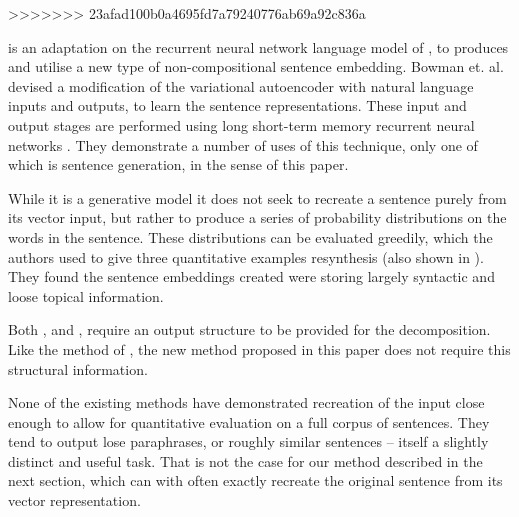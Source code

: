 \documentclass[11pt]{article}
\theoremstyle{plain}
\theoremstyle{definition}
\begin{document}
>>>>>>> 23afad100b0a4695fd7a79240776ab69a92c836a




\textcite{Bowman2015SmoothGeneration} is an adaptation on the recurrent neural network language model of \textcite{mikolov2011RnnLM}, to produces and utilise a new type of non-compositional sentence embedding. Bowman et. al. devised a modification of the variational autoencoder  \parencite{kingma2013auto} with natural language inputs and outputs, to learn the sentence representations. These input and output stages are performed using long short-term memory recurrent neural networks \parencite{hochreiter1997long}. They demonstrate a number of uses of this technique, only one of which is sentence generation, in the sense of this paper.

While it is a generative model it does not seek to recreate a sentence purely from its vector input, but rather to produce a series of probability distributions on the words in the sentence. These distributions can be evaluated greedily, which the authors used to give three quantitative examples resynthesis (also shown in ). They found the sentence embeddings created were storing largely syntactic and loose topical information. 


Both \textcite{Dinu2014CompositionalGeneration}, and  \textcite{iyyer2014generating}, require an output structure to be provided for the decomposition. Like the method of  \textcite{Bowman2015SmoothGeneration}, the new method proposed in this paper does not require this structural information.

None of the existing methods have demonstrated recreation of the input close enough to allow for quantitative evaluation on a full corpus of sentences. They tend to output lose paraphrases, or roughly similar sentences -- itself a slightly distinct and useful task.  That is not the case for our method described in the next section, which can with often exactly recreate the original sentence from its vector representation.
\end{document}
